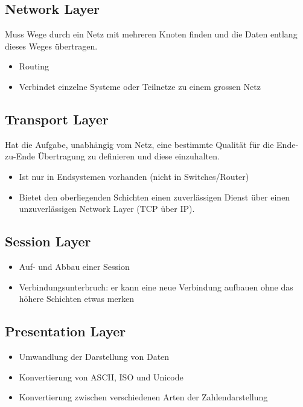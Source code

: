 \subsection*{Network Layer}

Muss Wege durch ein Netz mit mehreren Knoten finden und die Daten
entlang dieses Weges übertragen.
\begin{itemize}
\item Routing
\item Verbindet einzelne Systeme oder Teilnetze zu einem grossen Netz
\end{itemize}

\subsection*{Transport Layer}

Hat die Aufgabe, unabhängig vom Netz, eine bestimmte Qualität für
die Ende-zu-Ende Übertragung zu definieren und diese einzuhalten.
\begin{itemize}
\item Ist nur in Endsystemen vorhanden (nicht in Switches/Router)
\item Bietet den oberliegenden Schichten einen zuverlässigen Dienst über
einen unzuverlässigen Network Layer (TCP über IP).
\end{itemize}

\subsection*{Session Layer}
\begin{itemize}
\item Auf- und Abbau einer Session
\item Verbindungsunterbruch: er kann eine neue Verbindung aufbauen ohne
das höhere Schichten etwas merken
\end{itemize}

\subsection*{Presentation Layer}
\begin{itemize}
\item Umwandlung der Darstellung von Daten
\item Konvertierung von ASCII, ISO und Unicode
\item Konvertierung zwischen verschiedenen Arten der Zahlendarstellung
\end{itemize}

